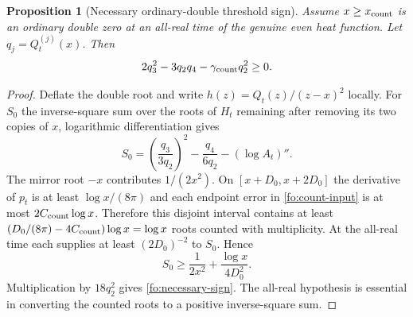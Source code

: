 \documentclass[11pt]{article}
\numberwithin{equation}{section}
\newtheorem{proposition}[theorem]{Proposition}
\theoremstyle{definition}
\theoremstyle{remark}
\begin{document}
\begin{proposition}[Necessary ordinary-double threshold sign]
\label{fo:threshold-sign}
Assume $x\ge x_{\rm count}$ is an ordinary double zero at an all-real
time of the genuine even heat function.  Let $q_j=Q_t^{(j)}(x)$.
Then
\begin{equation}
2q_3^2-3q_2q_4-\gamma_{\rm count}q_2^2\ge0.
\label{fo:necessary-sign}
\end{equation}
\end{proposition}
\begin{proof}
Deflate the double root and write $h(z)=Q_t(z)/(z-x)^2$ locally.
For $S_0$ the inverse-square sum over the roots of $H_t$ remaining
after removing its two copies of $x$, logarithmic differentiation gives
\begin{equation}
S_0=\left(\frac{q_3}{3q_2}\right)^2
       -\frac{q_4}{6q_2}-(\log A_t)''.
\end{equation}
The mirror root $-x$ contributes $1/(2x^2)$.  On
$[x+D_0,x+2D_0]$ the derivative of $p_t$ is at least
$\log x/(8\pi)$ and each endpoint error in
\eqref{fo:count-input} is at most $2C_{\rm count}\log x$.
Therefore this disjoint interval contains at least
$(D_0/(8\pi)-4C_{\rm count})\log x=\log x$ roots counted with
multiplicity.  At the all-real time each supplies at least
$(2D_0)^{-2}$ to $S_0$.  Hence
\begin{equation}
S_0\ge\frac1{2x^2}+\frac{\log x}{4D_0^2}.
\end{equation}
Multiplication by $18q_2^2$ gives \eqref{fo:necessary-sign}.
The all-real hypothesis is essential in converting the counted roots
to a positive inverse-square sum.
\end{proof}
\end{document}
